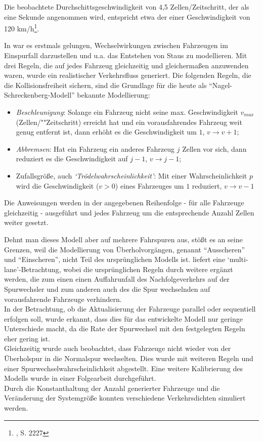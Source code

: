 Die beobachtete Durchschittsgeschwindigkeit von 4,5 Zellen/Zeitschritt, der als eine Sekunde angenommen wird, entspricht etwa der einer Geschwindigkeit von 120 km/h\footnote{\cite{na-sch}, S. 2227}. 

In \cite{na-sch} war es erstmals gelungen, Wechselwirkungen zwischen Fahrzeugen im Einspurfall darzustellen %
und u.a. das Entstehen von Staus zu modellieren. 
Mit drei Regeln, die auf jedes Fahrzeug gleichzeitig und gleichermaßen anzuwenden waren, wurde ein realistischer Verkehrsfluss generiert. 
Die folgenden Regeln, die die Kollisionsfreiheit sichern, sind die Grundlage für die heute als \enquote{Nagel-Schreckenberg-Modell} bekannte Modellierung:

\begin{itemize}
\item \textit{Beschleunigung}: Solange ein Fahrzeug nicht seine max. Geschwindigkeit $v_{max}$ (Zellen/""Zeitschritt) erreicht hat und ein vorausfahrendes Fahrzeug weit genug entfernt ist, dann erhöht es die Geschwindigkeit um $1$, $v \rightarrow v+1$;
\item \textit{Abbremsen}: Hat ein Fahrzeug ein anderes Fahrzeug $j$ Zellen vor sich, dann reduziert es die Geschwindigkeit auf $j-1$, $v \rightarrow j-1$;
\item Zufallsgröße, auch \textit{\enquote*{Trödelwahrscheinlichkeit}}: Mit einer Wahrscheinlichkeit $p$ wird die Geschwindigkeit ($v > 0$) eines Fahrzeuges um $1$ reduziert, $v \rightarrow v-1$
\end{itemize}

Die Anweisungen werden in der angegebenen Reihenfolge - für alle Fahrzeuge gleichzeitig - ausgeführt und jedes Fahrzeug um die entsprechende Anzahl Zellen weiter gesetzt.

Dehnt man dieses Modell aber auf mehrere Fahrspuren aus, stößt es an seine Grenzen, weil die Modellierung von Überholvorgängen, genannt \enquote{Ausscheren} und \enquote{Einscheren}, nicht Teil des ursprünglichen Modells ist. 
\cite{multi-lane} liefert eine \enquote*{multi-lane}-Betrachtung, wobei die ursprünglichen Regeln durch weitere ergänzt werden, die zum einen einen Auffahrunfall des Nachfolgeverkehrs auf der Spurwechsler und zum anderen auch des die Spur wechselnden auf vorausfahrende Fahrzeuge verhindern. \\
In der Betrachtung, ob die Aktualisierung der Fahrzeuge parallel oder sequentiell erfolgen soll, wurde erkannt, dass dies für das entwickelte Modell nur geringe Unterschiede macht, da die Rate der Spurwechsel mit den festgelegten Regeln eher gering ist. \\
Gleichzeitig wurde auch beobachtet, dass Fahrzeuge nicht wieder von der Überholspur in die Normalspur wechselten. Dies wurde mit weiteren Regeln und einer Spurwechselwahrscheinlichkeit abgestellt. Eine weitere Kalibrierung des Modells wurde in einer Folgearbeit durchgeführt. \\
Durch die Konstanthaltung der Anzahl generierter Fahrzeuge und die Veränderung der Systemgröße konnten verschiedene Verkehrsdichten simuliert werden.

